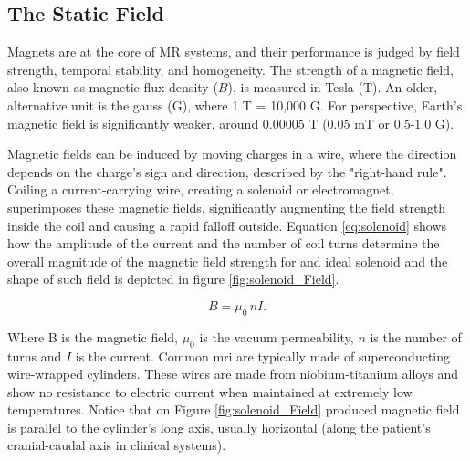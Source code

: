 





\subsection{The Static Field}

Magnets are at the core of MR systems, and their performance is judged by field strength, temporal stability, and homogeneity. The strength of a magnetic field, also known as magnetic flux density ($B$), is measured in Tesla (T). An older, alternative unit is the gauss (G), where 1 T = 10,000 G. For perspective, Earth's magnetic field is significantly weaker, around 0.00005 T (0.05 mT or 0.5-1.0 G).

Magnetic fields can be induced by moving charges in a wire, where the direction depends on the charge's sign and direction, described by the "right-hand rule". Coiling a current-carrying wire, creating a solenoid or electromagnet, superimposes these magnetic fields, significantly augmenting the field strength inside the coil and causing a rapid falloff outside. Equation \ref{eq:solenoid} shows how the amplitude of the current and the number of coil turns determine the overall magnitude of the magnetic field strength for and ideal solenoid and the shape of such field is depicted in figure \ref{fig:solenoid_Field}. 

\begin{equation}
	B = \mu_{0} \, n I.
	\label{eq:solenoid}
\end{equation}

\noindent Where B is the magnetic field, $\mu_{0}$ is the vacuum permeability, $n$ is the number of turns and $I$ is the current. Common \gls{mri} are typically made of superconducting wire-wrapped cylinders. These wires are made from niobium-titanium alloys and show no resistance to electric current when maintained at extremely low temperatures. Notice that on Figure \ref{fig:solenoid_Field} produced magnetic field is parallel to the cylinder's long axis, usually horizontal (along the patient's cranial-caudal axis in clinical systems).


